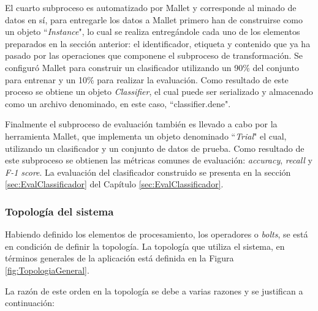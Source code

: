 El cuarto subproceso es automatizado por Mallet y corresponde al minado de datos en sí, para entregarle los datos a Mallet primero han de construirse como un objeto ``\textit{Instance}", lo cual se realiza entregándole cada uno de los elementos preparados en la sección anterior: el identificador, etiqueta y contenido que ya ha pasado por las operaciones que componene el subproceso de transformación. Se configuró Mallet para construir un clasificador utilizando un 90\% del conjunto para entrenar y un 10\% para realizar la evaluación. Como resultado de este proceso se obtiene un objeto \textit{Classifier}, el cual puede ser serializado y almacenado como un archivo denominado, en este caso, ``classifier.dene". 

Finalmente el subproceso de evaluación también es llevado a cabo por la herramienta Mallet, que implementa un objeto denominado ``\textit{Trial}" el cual, utilizando un clasificador y un conjunto de datos de prueba. Como resultado de este subproceso se obtienen las métricas comunes de evaluación: \textit{accuracy}, \textit{recall} y \textit{F-1 score}. La evaluación del clasificador construido se presenta en la sección \ref{sec:EvalClassificador} del Capítulo \ref{sec:EvalClassificador}. 

\subsubsection*{Topología del sistema}
\label{subsubsec:topologiaSistema}

Habiendo definido los elementos de procesamiento, los operadores o \textit{bolts}, se está en condición de definir la topología. La topología que utiliza el sistema, en términos generales de la aplicación está definida en la Figura \ref{fig:TopologiaGeneral}.

La razón de este orden en la topología se debe a varias razones y se justifican a continuación:

